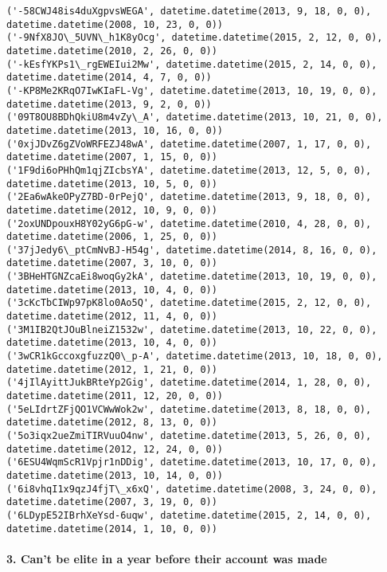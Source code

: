 \documentclass[11pt]{article}
\begin{document}
    \begin{Verbatim}[commandchars=\\\{\}]
('-58CWJ48is4duXgpvsWEGA', datetime.datetime(2013, 9, 18, 0, 0), datetime.datetime(2008, 10, 23, 0, 0))
('-9NfX8JO\_5UVN\_h1K8yOcg', datetime.datetime(2015, 2, 12, 0, 0), datetime.datetime(2010, 2, 26, 0, 0))
('-kEsfYKPs1\_rgEWEIui2Mw', datetime.datetime(2015, 2, 14, 0, 0), datetime.datetime(2014, 4, 7, 0, 0))
('-KP8Me2KRqO7IwKIaFL-Vg', datetime.datetime(2013, 10, 19, 0, 0), datetime.datetime(2013, 9, 2, 0, 0))
('09T8OU8BDhQkiU8m4vZy\_A', datetime.datetime(2013, 10, 21, 0, 0), datetime.datetime(2013, 10, 16, 0, 0))
('0xjJDvZ6gZVoWRFEZJ48wA', datetime.datetime(2007, 1, 17, 0, 0), datetime.datetime(2007, 1, 15, 0, 0))
('1F9di6oPHhQm1qjZIcbsYA', datetime.datetime(2013, 12, 5, 0, 0), datetime.datetime(2013, 10, 5, 0, 0))
('2Ea6wAkeOPyZ7BD-0rPejQ', datetime.datetime(2013, 9, 18, 0, 0), datetime.datetime(2012, 10, 9, 0, 0))
('2oxUNDpouxH8Y02yG6pG-w', datetime.datetime(2010, 4, 28, 0, 0), datetime.datetime(2006, 1, 25, 0, 0))
('37jJedy6\_ptCmNvBJ-H54g', datetime.datetime(2014, 8, 16, 0, 0), datetime.datetime(2007, 3, 10, 0, 0))
('3BHeHTGNZcaEi8woqGy2kA', datetime.datetime(2013, 10, 19, 0, 0), datetime.datetime(2013, 10, 4, 0, 0))
('3cKcTbCIWp97pK8lo0Ao5Q', datetime.datetime(2015, 2, 12, 0, 0), datetime.datetime(2012, 11, 4, 0, 0))
('3M1IB2QtJOuBlneiZ1532w', datetime.datetime(2013, 10, 22, 0, 0), datetime.datetime(2013, 10, 4, 0, 0))
('3wCR1kGccoxgfuzzQ0\_p-A', datetime.datetime(2013, 10, 18, 0, 0), datetime.datetime(2012, 1, 21, 0, 0))
('4jIlAyittJukBRteYp2Gig', datetime.datetime(2014, 1, 28, 0, 0), datetime.datetime(2011, 12, 20, 0, 0))
('5eLIdrtZFjQO1VCWwWok2w', datetime.datetime(2013, 8, 18, 0, 0), datetime.datetime(2012, 8, 13, 0, 0))
('5o3iqx2ueZmiTIRVuuO4nw', datetime.datetime(2013, 5, 26, 0, 0), datetime.datetime(2012, 12, 24, 0, 0))
('6ESU4WqmScR1Vpjr1nDDig', datetime.datetime(2013, 10, 17, 0, 0), datetime.datetime(2013, 10, 14, 0, 0))
('6i8vhqI1x9qzJ4fjT\_x6xQ', datetime.datetime(2008, 3, 24, 0, 0), datetime.datetime(2007, 3, 19, 0, 0))
('6LDypE52IBrhXeYsd-6uqw', datetime.datetime(2015, 2, 14, 0, 0), datetime.datetime(2014, 1, 10, 0, 0))

    \end{Verbatim}

    \paragraph{3. Can't be elite in a year before their account was
made}\label{cant-be-elite-in-a-year-before-their-account-was-made}
\end{document}
